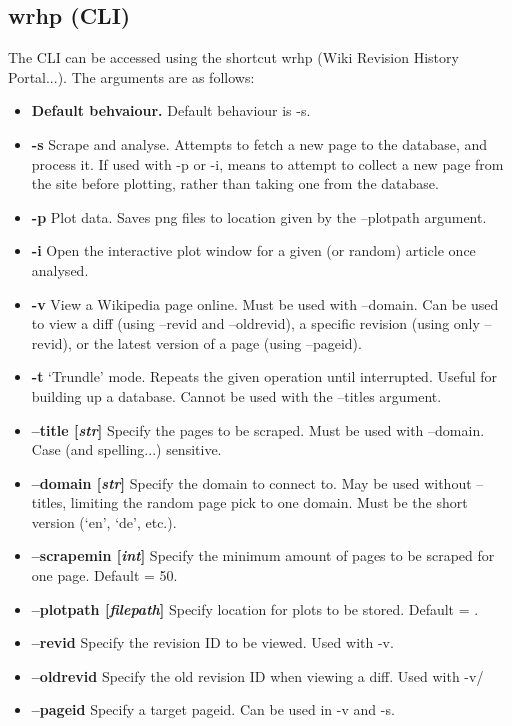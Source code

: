 \subsection*{wrhp (CLI)}
The CLI can be accessed using the shortcut wrhp (Wiki Revision History
Portal...). The arguments are as follows:

\begin{itemize}[label={}]
  \item \textbf{Default behvaiour.} Default behaviour is -s.
  \item \textbf{-s} Scrape and analyse. Attempts to fetch a new page
    to the database, and process it. If used with -p or -i, means to
    attempt to collect a new page from the site before plotting,
    rather than taking one from the database.
  \item \textbf{-p} Plot data. Saves png files to location given by
    the --plotpath argument.
  \item \textbf{-i} Open the interactive plot window for a given (or
    random) article once analysed.
  \item \textbf{-v} View a Wikipedia page online. Must be used with
    --domain. Can be used to view a diff (using --revid and
    --oldrevid), a specific revision (using only --revid), or the
    latest version of a page (using --pageid).
  \item \textbf{-t} `Trundle' mode. Repeats the given operation until
    interrupted. Useful for building up a database. Cannot be used
    with the --titles argument.
  \item \textbf{--title [\textit{str}]} Specify the
    pages to be scraped. Must be used with --domain. Case (and
    spelling...)  sensitive.
  \item \textbf{--domain [\textit{str}]} Specify the domain to connect
    to. May be used without --titles, limiting the random page pick to
    one domain. Must be the short version (`en', `de', etc.).
  \item \textbf{--scrapemin [\textit{int}]} Specify the minimum amount of
    pages to be scraped for one page. Default = 50.
  \item \textbf{--plotpath [\textit{filepath}]} Specify location for
    plots to be stored. Default = .
  \item \textbf{--revid} Specify the revision ID to be viewed. Used
    with -v.
  \item \textbf{--oldrevid} Specify the old revision ID when viewing a
    diff. Used with -v/
  \item \textbf{--pageid} Specify a target pageid. Can be used in -v
    and -s.
\end{itemize}
